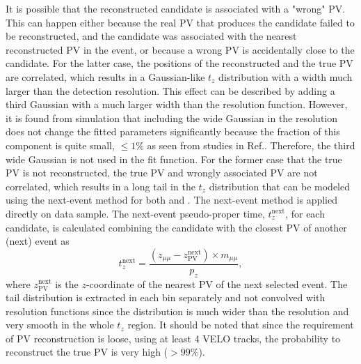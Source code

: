 It is possible that the reconstructed candidate is associated with a "wrong" PV. 
This can happen either because the real PV that produces the candidate failed to be reconstructed, and the candidate was associated with the nearest reconstructed PV in the event, or because a wrong PV is accidentally close to the candidate.
For the latter case, the positions of the reconstructed and the true PV are correlated, which results in a Gaussian-like $t_z$ distribution with a width much larger than the detection resolution. 
This effect can be described by adding a third Gaussian with a much larger width than the resolution function. 
However, it is found from simulation that including the wide Gaussian in the resolution does not change the fitted parameters significantly because the fraction of this component is quite small, $\leq 1\%$ as seen from studies in Ref.\cite{LHCb-PAPER-2015-037}.
Therefore, the third wide Gaussian is not used in the fit function.
For the former case that the true PV is not reconstructed, the true PV and wrongly associated PV are not correlated, which results in a long tail in the $t_z$ distribution that can be modeled using the next-event method for both \jpsi and \psitwos. 
The next-event method is applied directly on data sample. 
The next-event pseudo-proper time, $t_z^\mathrm{next}$, for each candidate, is calculated combining the candidate with the closest PV of another (next) event as
\begin{equation}
t_z^\mathrm{next}=\frac{(z_{\mu\mu}-z_\mathrm{PV}^\mathrm{next})\times m_{\mu\mu}}{p_z},
\end{equation}
where $z_\mathrm{PV}^\mathrm{next}$ is the $z$-coordinate of the nearest PV of the next selected event. 
The tail distribution is extracted in each bin separately and not convolved with resolution functions since the distribution is much wider than the resolution and very smooth in the whole $t_z$ region.
It should be noted that since the requirement of PV reconstruction is loose, using at least 4 VELO tracks, the probability to reconstruct the true PV is very high ($>99\%$). 

